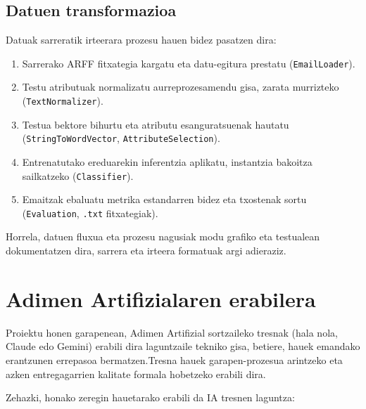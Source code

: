 \documentclass[12pt, a4paper]{article}
\begin{document}
\subsection{Datuen transformazioa}

Datuak sarreratik irteerara prozesu hauen bidez pasatzen dira:

\begin{enumerate}
    \item Sarrerako ARFF fitxategia kargatu eta datu-egitura prestatu (\texttt{EmailLoader}).
    
    \item Testu atributuak normalizatu aurreprozesamendu gisa, zarata murrizteko (\texttt{TextNormalizer}).
    
    \item Testua bektore bihurtu eta atributu esanguratsuenak hautatu
    (\texttt{StringToWordVector}, \texttt{AttributeSelection}).
    
    \item Entrenatutako ereduarekin inferentzia aplikatu,
    instantzia bakoitza sailkatzeko (\texttt{Classifier}).
    
    \item Emaitzak ebaluatu metrika estandarren bidez eta txostenak sortu
    (\texttt{Evaluation}, \texttt{.txt} fitxategiak).
\end{enumerate}

Horrela, datuen fluxua eta prozesu nagusiak modu grafiko eta testualean dokumentatzen dira, sarrera eta irteera formatuak argi adieraziz.

\newpage
\section{Adimen Artifizialaren erabilera}

Proiektu honen garapenean, Adimen Artifizial sortzaileko tresnak (hala nola, Claude edo Gemini) erabili dira laguntzaile tekniko gisa, betiere, hauek emandako erantzunen errepasoa bermatzen.Tresna hauek garapen-prozesua arintzeko eta azken entregagarrien kalitate formala hobetzeko erabili dira.

Zehazki, honako zeregin hauetarako erabili da IA tresnen laguntza:
\end{document}

